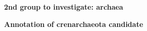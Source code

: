 \documentclass[landscape]{slides}
\begin{document}
\begin{slide}
\begin{center}
\textbf{2nd group to investigate: archaea}
\end{center}


\vfill
\end{slide}
\begin{slide}
\begin{center}
\textbf{Annotation of crenarchaeota candidate}
\end{center}


\vfill
\end{slide}
\end{document}
